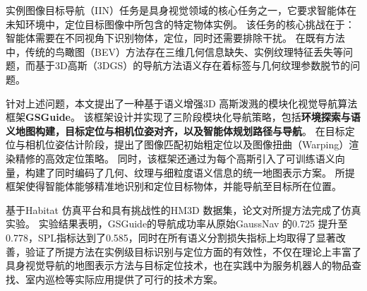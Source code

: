 实例图像目标导航（IIN）任务是具身视觉领域的核心任务之一，它要求智能体在未知环境中，定位目标图像中所包含的特定物体实例。
该任务的核心挑战在于：智能体需要在不同视角下识别物体，定位，同时还需要排除干扰。
在既有方法中，传统的鸟瞰图（BEV）方法存在三维几何信息缺失、实例纹理特征丢失等问题，而基于3D高斯（3DGS）的导航方法语义存在着标签与几何纹理参数脱节的问题。

针对上述问题，本文提出了一种基于语义增强3D 高斯泼溅的模块化视觉导航算法框架\textbf{GSGuide}。
该框架设计并实现了三阶段模块化导航策略，包括\textbf{环境探索与语义地图构建，目标定位与相机位姿对齐，以及智能体规划路径与导航}。
在目标定位与相机位姿估计阶段，提出了图像匹配初始粗定位以及图像扭曲（Warping）渲染精修的高效定位策略。
同时，该框架还通过为每个高斯引入了可训练语义向量，构建了同时编码了几何、纹理与细粒度语义信息的统一地图表示方案。
所提框架使得智能体能够精准地识别和定位目标物体，并能导航至目标所在位置。


基于Habitat 仿真平台和具有挑战性的HM3D 数据集，论文对所提方法完成了仿真实验。
实验结果表明，GSGuide的导航成功率从原始GaussNav 的0.725 提升至0.778，SPL指标达到了0.585，同时在所有语义分割损失指标上均取得了显著改善，验证了所提方法在实例级目标识别与定位方面的有效性，不仅在理论上丰富了具身视觉导航的地图表示方法与目标定位技术，也在实践中为服务机器人的物品查找、室内巡检等实际应用提供了可行的技术方案。